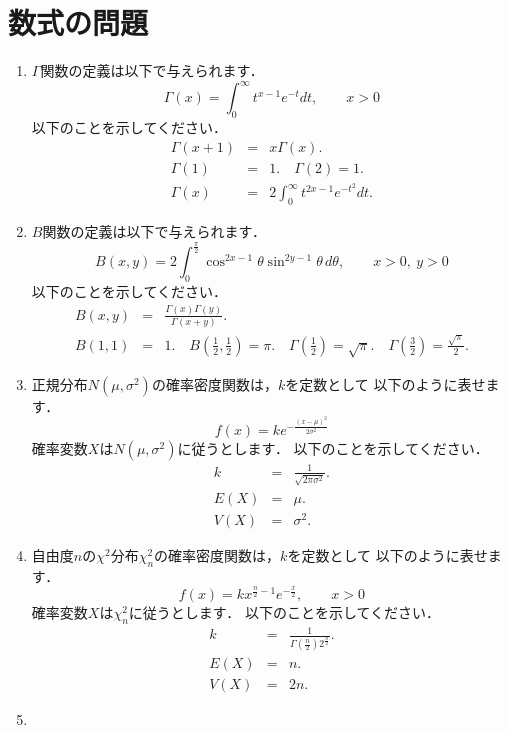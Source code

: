 \documentclass[12pt]{ltjsarticle}
\begin{document}
\section{数式の問題}
\begin{enumerate}
\item
$\Gamma$関数の定義は以下で与えられます．
\[
\Gamma\left(x\right)=\int_0^\infty t^{x-1}e^{-t}dt,\qquad
x>0
\]
以下のことを示してください．
\begin{eqnarray*}
\Gamma\left(x+1\right)&=&x\Gamma\left(x\right). \\
\Gamma\left(1\right)&=&1. \quad
\Gamma\left(2\right)=1. \\
\Gamma\left(x\right)&=&2\int_0^\infty t^{2x-1}e^{-t^2}dt.
\end{eqnarray*}
\item
$B$関数の定義は以下で与えられます．
\[
B\left(x,y\right)=2\int_0^\frac{\pi}{2}
\cos^{2x-1}\theta\sin^{2y-1}\theta\,d\theta,\qquad
x>0,\ y>0
\]
以下のことを示してください．
\begin{eqnarray*}
B\left(x,y\right)&=&
\frac{\Gamma\left(x\right)\Gamma\left(y\right)}{\Gamma\left(x+y\right)}. \\
B\left(1,1\right)&=&1. \quad
B\left(\frac{1}{2},\frac{1}{2}\right)=\pi. \quad
\Gamma\left(\frac{1}{2}\right)=\sqrt{\pi}. \quad
\Gamma\left(\frac{3}{2}\right)=\frac{\sqrt{\pi}}{2}.
\end{eqnarray*}
\item
正規分布$N\left(\mu,\sigma^2\right)$の確率密度関数は，$k$を定数として
以下のように表せます．
\[
f\left(x\right)=ke^{-\frac{\left(x-\mu\right)^2}{2\sigma^2}}
\]
確率変数$X$は$N\left(\mu,\sigma^2\right)$に従うとします．
以下のことを示してください．
\begin{eqnarray*}
k&=&\frac{1}{\sqrt{2\pi\sigma^2}}. \\
E\left(X\right)&=&\mu. \\
V\left(X\right)&=&\sigma^2.
\end{eqnarray*}
\item
自由度$n$の$\chi^2$分布$\chi_n^2$の確率密度関数は，$k$を定数として
以下のように表せます．
\[
f\left(x\right)=kx^{\frac{n}{2}-1}e^{-\frac{x}{2}},\qquad
x>0
\]
確率変数$X$は$\chi_n^2$に従うとします．
以下のことを示してください．
\begin{eqnarray*}
k&=&\frac{1}{\Gamma\left(\frac{n}{2}\right)2^{\frac{n}{2}}}. \\
E\left(X\right)&=&n. \\
V\left(X\right)&=&2n.
\end{eqnarray*}
\item

\end{enumerate}
\end{document}
